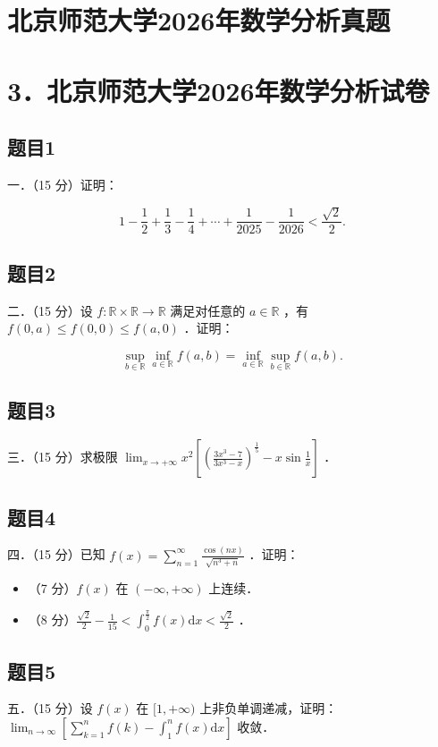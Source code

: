 \documentclass{article}
\begin{document}
\section*{北京师范大学2026年数学分析真题}
\section*{3．北京师范大学2026年数学分析试卷}

\subsection{题目1}
一．（15 分）证明：

\[
1-\frac{1}{2}+\frac{1}{3}-\frac{1}{4}+\cdots+\frac{1}{2025}-\frac{1}{2026}<\frac{\sqrt{2}}{2} .
\]

\subsection{题目2}
二．（15 分）设 \(f: \mathbb{R} \times \mathbb{R} \rightarrow \mathbb{R}\) 满足对任意的 \(a \in \mathbb{R}\) ，有 \(f(0, a) \leq f(0,0) \leq f(a, 0)\) ．证明：

\[
\sup _{b \in \mathbb{R}} \inf _{a \in \mathbb{R}} f(a, b)=\inf _{a \in \mathbb{R}} \sup _{b \in \mathbb{R}} f(a, b) .
\]

\subsection{题目3}
三．（15 分）求极限 \(\lim _{x \rightarrow+\infty} x^{2}\left[\left(\frac{3 x^{3}-7}{3 x^{3}-x}\right)^{\frac{1}{5}}-x \sin \frac{1}{x}\right]\) ．

\subsection{题目4}
四．（15 分）已知 \(f(x)=\sum_{n=1}^{\infty} \frac{\cos (n x)}{\sqrt{n^{3}+n}}\) ．证明：

\begin{itemize}
  \item[（1）] （7 分）\(f(x)\) 在 \((-\infty,+\infty)\) 上连续．
  \item[（2）] （8 分）\(\frac{\sqrt{2}}{2}-\frac{1}{15}<\int_{0}^{\frac{\pi}{2}} f(x) \mathrm{d} x<\frac{\sqrt{2}}{2}\) ．
\end{itemize}

\subsection{题目5}
五．（15 分）设 \(f(x)\) 在 \([1,+\infty)\) 上非负单调递减，证明： \(\lim _{n \rightarrow \infty}\left[\sum_{k=1}^{n} f(k)-\int_{1}^{n} f(x) \mathrm{d} x\right]\) 收敛．
\end{document}
